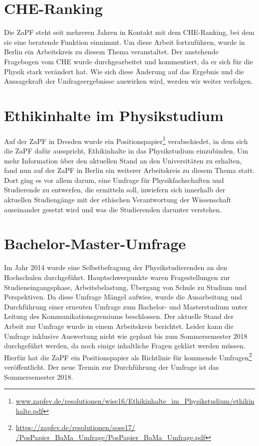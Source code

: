 \documentclass[a4paper]{article}
\begin{document}
\section*{CHE-Ranking} 
Die  ZaPF steht seit mehreren Jahren in Kontakt mit dem CHE-Ranking, bei dem  sie eine beratende Funktion einnimmt. Um diese Arbeit fortzuführen, wurde in Berlin ein Arbeitskreis zu  diesem Thema veranstaltet. Der anstehende Fragebogen vom CHE wurde durchgearbeitet und kommentiert, da er sich für die Physik stark verändert hat. Wie sich diese Änderung auf das Ergebnis und die Aussagekraft der Umfrageergebnisse auswirken wird, werden wir weiter verfolgen.


\section*{Ethikinhalte im Physikstudium}
Auf der ZaPF in Dresden wurde ein Positionspapier\footnote{\href{https://zapfev.de/resolutionen/wise16/Ethikinhalte_im_Physikstudium/ethikinhalte.pdf}{\url{www.zapfev.de/resolutionen/wise16/Ethikinhalte_im_Physikstudium/ethikinhalte.pdf}}}  verabschiedet, in dem sich die ZaPF dafür ausspricht, Ethikinhalte in das Physikstudium einzubinden. 
Um  mehr Information über den aktuellen Stand an den Universitäten zu  erhalten, fand nun auf der ZaPF in Berlin ein weiterer Arbeitskreis zu  diesem Thema statt. Dort ging es vor allem darum, eine Umfrage für  Physikfachschaften und Studierende zu entwerfen, die ermitteln soll, inwiefern  sich innerhalb der aktuellen Studiengänge mit der ethischen  Verantwortung der Wissenschaft auseinander gesetzt wird und was die  Studierenden darunter verstehen.


\section*{Bachelor-Master-Umfrage}
Im  Jahr 2014 wurde eine Selbstbefragung der Physikstudierenden an den  Hochschulen durchgeführt. Hauptschwerpunkte waren Fragestellungen zur  Studieneingangsphase, 
Arbeitsbelastung,  Übergang von Schule zu Studium und Perspektiven. Da diese  Umfrage Mängel aufwies, wurde die Ausarbeitung und Durchführung einer erneuten 
Umfrage zum Bachelor- und Masterstudium unter Leitung des Kommunikationsgremiums beschlossen. Der  aktuelle Stand der Arbeit zur Umfrage wurde in einem Arbeitskreis berichtet. Leider kann die Umfrage inklusive Auswertung nicht wie geplant bis zum Sommersemester 2018  durchgeführt werden, da noch einige inhaltliche Fragen geklärt werden müssen. Hierfür hat die ZaPF ein Positionspapier  als Richtlinie für kommende Umfragen\footnote{\href{https://zapfev.de/resolutionen/sose17//PosPapier_BaMa_Umfrage/PosPapier_BaMa_Umfrage.pdf}{\url{https://zapfev.de/resolutionen/sose17/
/PosPapier_BaMa_Umfrage/PosPapier_BaMa_Umfrage.pdf}}} veröffentlicht. Der neue Termin zur Durchführung der Umfrage ist das Sommersemester 2018.
\end{document}
